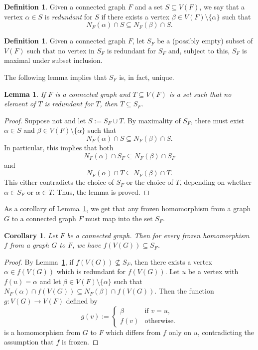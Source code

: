 \documentclass[11 pt]{amsart}
\newtheorem{lem}[equation]{Lemma}
\newtheorem{cor}[equation]{Corollary}
\theoremstyle{definition}
\newtheorem{defn}[equation]{Definition}
\theoremstyle{case}
\numberwithin{equation}{section}
\begin{document}
\begin{defn}
Given a connected graph $F$ and a set $S\subseteq V(F)$, we say that a vertex $\alpha\in S$ is \emph{redundant} for $S$ if there exists a vertex $\beta\in V(F)\setminus\{\alpha\}$ such that
\[N_F(\alpha)\cap S\subseteq N_F(\beta)\cap S.\]
\end{defn}

\begin{defn}
Given a connected graph $F$, let $S_F$ be a (possibly empty) subset of $V(F)$ such that no vertex in $S_F$ is redundant for $S_F$ and, subject to this, $S_F$ is maximal under subset inclusion. 
\end{defn}

The following lemma implies that $S_F$ is, in fact, unique.

\begin{lem}
\label{SFunique}
If $F$ is a connected graph and $T\subseteq V(F)$ is a set such that no element of $T$ is redundant for $T$, then $T\subseteq S_F$. 
\end{lem}

\begin{proof}
Suppose not and let $S:=S_F\cup T$. By maximality of $S_F$, there must exist $\alpha\in S$ and $\beta\in V(F)\setminus\{\alpha\}$ such that
\[N_F(\alpha)\cap S \subseteq N_F(\beta)\cap S.\]
In particular, this implies that both 
\[N_F(\alpha)\cap S_F \subseteq N_F(\beta)\cap S_F\]
and 
\[N_F(\alpha)\cap T \subseteq N_F(\beta)\cap T.\]
This either contradicts the choice of $S_F$ or the choice of $T$, depending on whether $\alpha\in S_F$ or $\alpha\in T$. Thus, the lemma is proved.
\end{proof}

As a corollary of Lemma~\ref{SFunique}, we get that any frozen homomorphism from a graph $G$ to a connected graph $F$ must map into the set $S_F$. 

\begin{cor}
\label{frozenGoesToS}
Let $F$ be a connected graph. Then for every frozen homomorphism $f$ from a graph $G$ to $F$, we have $f(V(G))\subseteq S_F$. 
\end{cor}

\begin{proof}
By Lemma~\ref{SFunique}, if $f(V(G))\nsubseteq S_F$, then there exists a vertex $\alpha\in f(V(G))$ which is redundant for $f(V(G))$. Let $u$ be a vertex with $f(u)=\alpha$ and let $\beta\in V(F)\setminus\{\alpha\}$ such that $N_F(\alpha)\cap f(V(G))\subseteq N_F(\beta)\cap f(V(G))$. Then the function $g:V(G)\to V(F)$ defined by 
\[g(v):=\left\{\begin{array}{ll}\beta & \text{if }v=u,\\
f(v) &\text{otherwise}.\end{array}\right.\]
is a homomorphism from $G$ to $F$ which differs from $f$ only on $u$, contradicting the assumption that $f$ is frozen.  
\end{proof}
\end{document}
